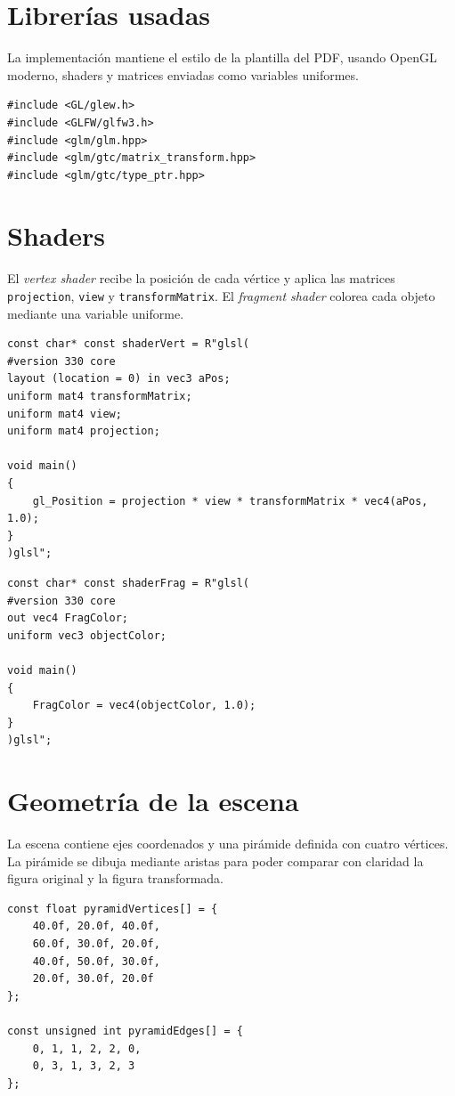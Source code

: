 \documentclass[12pt,a4paper]{article}
\begin{document}
\section*{Librer\'ias usadas}
La implementaci\'on mantiene el estilo de la plantilla del PDF, usando OpenGL moderno, shaders y matrices enviadas como variables uniformes.

\begin{lstlisting}[style=cxxcolor,caption={Librerias principales usadas.}]
#include <GL/glew.h>
#include <GLFW/glfw3.h>
#include <glm/glm.hpp>
#include <glm/gtc/matrix_transform.hpp>
#include <glm/gtc/type_ptr.hpp>
\end{lstlisting}

\section*{Shaders}
El \textit{vertex shader} recibe la posici\'on de cada v\'ertice y aplica las matrices \texttt{projection}, \texttt{view} y \texttt{transformMatrix}. El \textit{fragment shader} colorea cada objeto mediante una variable uniforme.

\begin{lstlisting}[style=cxxcolor,caption={Vertex shader usado en la practica.}]
const char* const shaderVert = R"glsl(
#version 330 core
layout (location = 0) in vec3 aPos;
uniform mat4 transformMatrix;
uniform mat4 view;
uniform mat4 projection;

void main()
{
    gl_Position = projection * view * transformMatrix * vec4(aPos, 1.0);
}
)glsl";
\end{lstlisting}

\begin{lstlisting}[style=cxxcolor,caption={Fragment shader usado para colorear la piramide y los ejes.}]
const char* const shaderFrag = R"glsl(
#version 330 core
out vec4 FragColor;
uniform vec3 objectColor;

void main()
{
    FragColor = vec4(objectColor, 1.0);
}
)glsl";
\end{lstlisting}

\section*{Geometr\'ia de la escena}
La escena contiene ejes coordenados y una pir\'amide definida con cuatro v\'ertices. La pir\'amide se dibuja mediante aristas para poder comparar con claridad la figura original y la figura transformada.

\begin{lstlisting}[style=cxxcolor,caption={Vertices de la piramide usada en las tres actividades.}]
const float pyramidVertices[] = {
    40.0f, 20.0f, 40.0f,
    60.0f, 30.0f, 20.0f,
    40.0f, 50.0f, 30.0f,
    20.0f, 30.0f, 20.0f
};

const unsigned int pyramidEdges[] = {
    0, 1, 1, 2, 2, 0,
    0, 3, 1, 3, 2, 3
};
\end{lstlisting}
\end{document}
